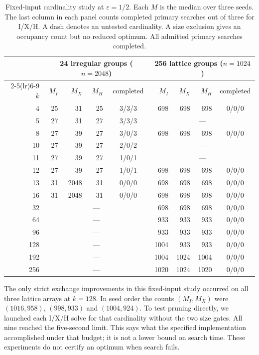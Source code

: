 \documentclass[a4paper,12pt]{article}
\numberwithin{equation}{section}
\begin{document}
\begin{table}[htbp]\centering\small
\caption{Fixed-input cardinality study at $\varepsilon=1/2$. Each $M$ is the median over three
seeds. The last column in each panel counts completed primary searches out of three for I/X/H.
A dash denotes an untested cardinality. A size exclusion gives an occupancy count but no
reduced optimum. All admitted primary searches completed.}\label{tab:fixed-input}
\begin{tabular}{@{}r rrrc@{\qquad}rrrc@{}}\toprule
&\multicolumn{4}{c}{24 irregular groups ($n=2048$)}&
\multicolumn{4}{c}{256 lattice groups ($n=1024$)}\\
\cmidrule(lr){2-5}\cmidrule(lr){6-9}
$k$&$M_I$&$M_X$&$M_H$&completed&$M_I$&$M_X$&$M_H$&completed\\\midrule
4 & 25 & 31 & 25 & 3/3/3 & 698 & 698 & 698 & 0/0/0\\
5 & 27 & 31 & 27 & 3/3/3 & \multicolumn{4}{c}{---}\\
8 & 27 & 39 & 27 & 3/0/3 & 698 & 698 & 698 & 0/0/0\\
10 & 27 & 39 & 27 & 2/0/2 & \multicolumn{4}{c}{---}\\
11 & 27 & 39 & 27 & 1/0/1 & \multicolumn{4}{c}{---}\\
12 & 27 & 39 & 27 & 1/0/1 & 698 & 698 & 698 & 0/0/0\\
13 & 31 & 2048 & 31 & 0/0/0 & 698 & 698 & 698 & 0/0/0\\
16 & 31 & 2048 & 31 & 0/0/0 & 698 & 698 & 698 & 0/0/0\\
32 & \multicolumn{4}{c}{---} & 698 & 698 & 698 & 0/0/0\\
64 & \multicolumn{4}{c}{---} & 933 & 933 & 933 & 0/0/0\\
96 & \multicolumn{4}{c}{---} & 933 & 933 & 933 & 0/0/0\\
128 & \multicolumn{4}{c}{---} & 1004 & 933 & 933 & 0/0/0\\
192 & \multicolumn{4}{c}{---} & 1004 & 1024 & 1004 & 0/0/0\\
256 & \multicolumn{4}{c}{---} & 1020 & 1024 & 1020 & 0/0/0\\
\bottomrule\end{tabular}
\end{table}

The only strict exchange improvements in this fixed-input study occurred on all three lattice
arrays at $k=128$. In seed order the counts $(M_I,M_X)$ were $(1016,958)$, $(998,933)$ and
$(1004,924)$. To test pruning directly, we launched each I/X/H solve for that cardinality
without the two size gates. All nine reached the five-second limit. This says what the
specified implementation accomplished under that budget; it is not a lower bound on search
time. These experiments do not certify an optimum when search fails.
\end{document}
